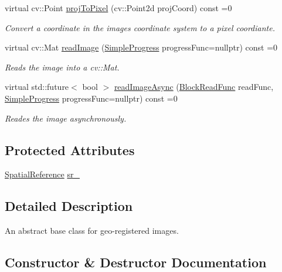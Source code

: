 \begin{DoxyCompactItemize}
virtual cv\+::\+Point \hyperlink{group___imagery_module_ga4935502553685c597c803da24f706b99}{proj\+To\+Pixel} (cv\+::\+Point2d proj\+Coord) const =0
\begin{DoxyCompactList}\small\item\em Convert a coordinate in the image\textquotesingle{}s coordinate system to a pixel coordiante. \end{DoxyCompactList}\item 
virtual cv\+::\+Mat \hyperlink{group___imagery_module_ga58e7e5d070e788600714a331c5bdaf02}{read\+Image} (\hyperlink{group___utility_module_ga6763018df79e4bdbcd8cd14cea5342b2}{Simple\+Progress} progress\+Func=nullptr) const =0
\begin{DoxyCompactList}\small\item\em Reads the image into a cv\+::\+Mat. \end{DoxyCompactList}\item 
virtual std\+::future$<$ bool $>$ \hyperlink{group___imagery_module_ga546feafefa76af28c13edab7a92e1cee}{read\+Image\+Async} (\hyperlink{group___imagery_module_ga2238c2ef34502f68956ddef1f477ad95}{Block\+Read\+Func} read\+Func, \hyperlink{group___utility_module_ga6763018df79e4bdbcd8cd14cea5342b2}{Simple\+Progress} progress\+Func=nullptr) const =0
\begin{DoxyCompactList}\small\item\em Reades the image asynchronously. \end{DoxyCompactList}\end{DoxyCompactItemize}
\subsection*{Protected Attributes}
\begin{DoxyCompactItemize}
\item 
\hyperlink{classdg_1_1deepcore_1_1imagery_1_1_spatial_reference}{Spatial\+Reference} \hyperlink{classdg_1_1deepcore_1_1imagery_1_1_geo_image_ae349f896afc816932b94bbafd135a7ea}{sr\+\_\+}
\end{DoxyCompactItemize}


\subsection{Detailed Description}
An abstract base class for geo-\/registered images. 

\subsection{Constructor \& Destructor Documentation}

